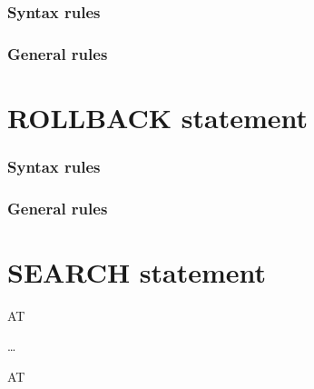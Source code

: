 \subsubsection{Syntax rules}

\subsubsection{General rules}

\section{ROLLBACK statement}

\begin{syntax}[\miscextcolour]
\end{syntax}

\subsubsection{Syntax rules}

\subsubsection{General rules}

\section{SEARCH statement}

\begin{syntax}
   \identifier
  \begin{0-1}
     \identifier
  \end{0-1}

  \begin{0-1}
    AT  \imperativestatement
  \end{0-1}

  \begin{1=}
     \condition \imperativestatement
  \end{1=} \ldots

  \begin{0-1}
  \end{0-1}
\end{syntax}

\begin{syntax}
    \identifier

  \begin{0-1}
    AT  \imperativestatement
  \end{0-1}

   \expression \imperativestatement

  \begin{0-1}
  \end{0-1}
\end{syntax}

